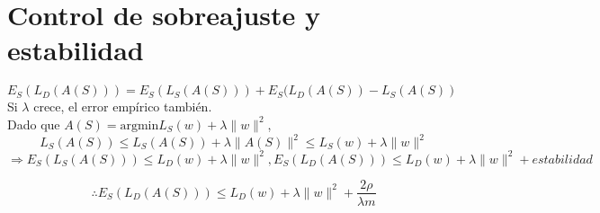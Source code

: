 \section{Control de sobreajuste y estabilidad}
$E_S(L_D(A(S))) = E_S(L_S(A(S))) + E_S(L_D(A(S))-L_S(A(S))$
Si $\lambda$ crece, el error empírico también.
\\

Dado que $A(S) = \mbox{argmin} L_S(w) + \lambda\|w\|^2$,
\begin{equation*}
    L_S(A(S)) \leq L_S(A(S)) + \lambda \|A(S)\|^2 \leq L_S(w) + \lambda \|w\|^2
\end{equation*}
\begin{equation*}
    \Rightarrow E_S(L_S(A(S))) \leq L_D(w) + \lambda \|w\|^2, E_S(L_D(A(S))) \leq L_D(w) + \lambda \|w\|^2 + estabilidad
\end{equation*}

\begin{equation*}
    \therefore E_S(L_D(A(S))) \leq L_D(w) + \lambda \|w\|^2 + \frac{2 \rho}{\lambda m}
\end{equation*}